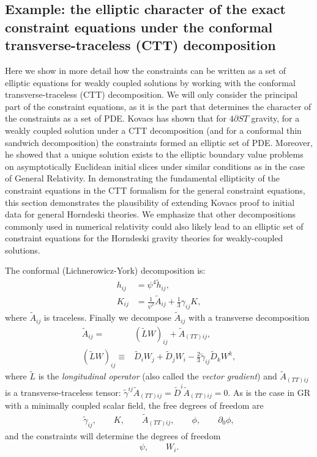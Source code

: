 \documentclass{ws-ijmpd}
\begin{document}
\subsection{Example: the elliptic character of the exact constraint equations
   under the conformal transverse-traceless (CTT) decomposition 
\label{eq:elliptic_character_constraints}
}
Here we show in more detail how the constraints can be written as
a set of elliptic equations for weakly coupled solutions
by working with the conformal
transverse-traceless (CTT) decomposition\cite{1979sgrr.work...83Y}.
We will only consider the principal part of the
constraint equations, as it is the part that determines the
character of the constraints as a set of PDE.
Kovacs\cite{Kovacs:2021lgk} has shown that for $4\partial ST$ gravity, 
for a weakly coupled solution under a 
CTT decomposition (and for a conformal thin sandwich decomposition)
the constraints formed an elliptic set of PDE. 
Moreover, he showed that a unique solution exists to the elliptic boundary
value problems on asymptotically Euclidean initial slices 
under similar conditions as in the case of General Relativity.
In demonstrating the fundamental ellipticity of the constraint equations in
the CTT formalism for the general constraint equations, this section 
demonstrates the plausibility of 
extending Kovacs proof to initial data for general Horndeski theories.
We emphasize that other decompositions commonly used in numerical relativity
could also likely lead to an elliptic set of constraint equations
for the Horndeski gravity theories for weakly-coupled solutions.

The conformal (Lichnerowicz-York) decomposition is:
\begin{align}
\label{eq:conformal_decomp_1}
   h_{ij}
   &=
   \psi^4\tilde{h}_{ij}
   ,\\
   K_{ij}
   &=
   \frac{1}{\psi^2}\tilde{A}_{ij}
   +
   \frac{1}{3}\gamma_{ij}K
   ,
\end{align}
where $\tilde{A}_{ij}$ is traceless.
Finally we decompose $\tilde{A}_{ij}$ 
with a transverse decomposition
\begin{align}
\label{eq:conformal_decomp_2}
   \tilde{A}_{ij}
   =&
   \left(\tilde{L}W\right)_{ij}
   +
   \tilde{A}_{(TT)ij}
   ,\\
   \left(\tilde{L}W\right)_{ij}
   \equiv&
   \tilde{D}_iW_j
   +
   \tilde{D}_jW_i
   -
   \frac{2}{3}\tilde{\gamma}_{ij}\tilde{D}_kW^k
   ,
\end{align}
where $\tilde{L}$ is the \emph{longitudinal operator}
(also called the \emph{vector gradient}) and 
$\tilde{A}_{(TT)ij}$ is a transverse-traceless tensor:
$\tilde{\gamma}^{ij}\tilde{A}_{(TT)ij}=\tilde{D}^i\tilde{A}_{(TT)ij}=0$.
As is the case in GR with a minimally coupled scalar field, 
the free degrees of freedom are
\begin{align}
   \tilde{\gamma}_{ij}
   ,\qquad
   K
   ,\qquad
   \tilde{A}_{(TT)ij}
   ,\qquad
   \phi
   ,\qquad
   \partial_0\phi
   ,
\end{align}
and the constraints will determine the degrees of freedom 
\begin{align}
   \psi
   ,\qquad
   W_i
   .
\end{align}
\end{document}
